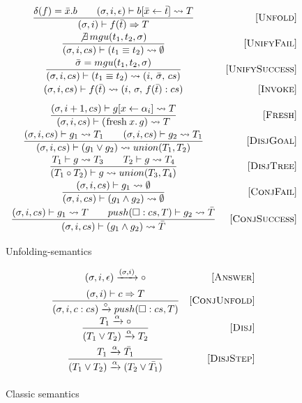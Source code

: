 \begin{figure}[h!]
\[\begin{array}{cr}

\dfrac{\delta(f) = \bar{x}. b \qquad (\sigma, i, \epsilon) \vdash b[\bar{x} \leftarrow \bar{t}] \leadsto T}
      {(\sigma, i) \vdash f(\bar{t}) \Rightarrow T}
&     \ruleno{Unfold} \\[3mm]
\dfrac{\not\exists \, mgu(t_1, t_2, \sigma)}
      {(\sigma, i, cs) \vdash (t_1 \equiv t_2) \leadsto \emptyset}
&     \ruleno{UnifyFail}  \\[3mm]
\dfrac{\bar\sigma = mgu(t_1, t_2, \sigma)}
      {(\sigma, i, cs) \vdash (t_1 \equiv t_2) \leadsto (i, \, \bar\sigma, \, cs)}
&     \ruleno{UnifySuccess}  \\[3mm]
      {(\sigma, i, cs) \vdash f(\bar{t}) \leadsto (i, \, \sigma, \, f(\bar{t}) : cs)}
&     \ruleno{Invoke} \\[3mm]
\dfrac{(\sigma, i+1, cs) \vdash g[x \leftarrow \alpha_i] \leadsto T}
      {(\sigma, i, cs) \vdash (\mbox{\lstinline|fresh|} \, x. \, g) \leadsto T}
&     \ruleno{Fresh}  \\[3mm]
\dfrac{(\sigma, i, cs) \vdash g_1 \leadsto T_1 \qquad (\sigma, i, cs) \vdash g_2 \leadsto T_1}
      {(\sigma, i, cs) \vdash (g_1 \lor g_2) \leadsto union(T_1, T_2)}
&     \ruleno{DisjGoal}  \\[3mm]
\dfrac{T_1 \vdash g \leadsto T_3 \qquad T_2 \vdash g \leadsto T_4}
      {(T_1 \circ T_2) \vdash g \leadsto union(T_3, T_4)}
&     \ruleno{DisjTree}  \\[3mm]
\dfrac{(\sigma, i, cs) \vdash g_1 \leadsto \emptyset}
      {(\sigma, i, cs) \vdash (g_1 \land g_2) \leadsto \emptyset}
&     \ruleno{ConjFail}  \\[3mm]
\dfrac{(\sigma, i, cs) \vdash g_1 \leadsto T \qquad push(\Box : cs, T) \vdash g_2 \leadsto \bar{T}}
      {(\sigma, i, cs) \vdash (g_1 \land g_2) \leadsto \bar{T}}
&     \ruleno{ConjSuccess}  \\[3mm]
\end{array}\]

\caption{Unfolding-semantics}
\label{fair:unfolding-semantics}
\end{figure}

\begin{figure}[h!]
\[\begin{array}{cr}

      {(\sigma, i, \epsilon) \xrightarrow{(\sigma, i)} \circ}  
&     \mbox{[\textsc{Answer}]} \\[2mm]
\dfrac{(\sigma, i) \vdash c \Rightarrow T}
      {(\sigma, i, c : cs) \xrightarrow{\circ} push(\Box : cs, T)}
&     \mbox{[\textsc{ConjUnfold}]} \\[2mm]
\dfrac{T_1 \xrightarrow{\alpha} \circ}
      {(T_1 \lor T_2) \xrightarrow{\alpha} T_2}
&     \mbox{[\textsc{Disj}]} \\[4mm]
\dfrac{T_1 \xrightarrow{\alpha} \bar{T_1}}
      {(T_1 \lor T_2) \xrightarrow{\alpha} (T_2 \lor\bar{T_1})}
&     \mbox{[\textsc{DisjStep}]} \\[4mm]
\end{array}\]
\caption{Classic semantics}
\label{fair:classic-semantics}
\end{figure}

